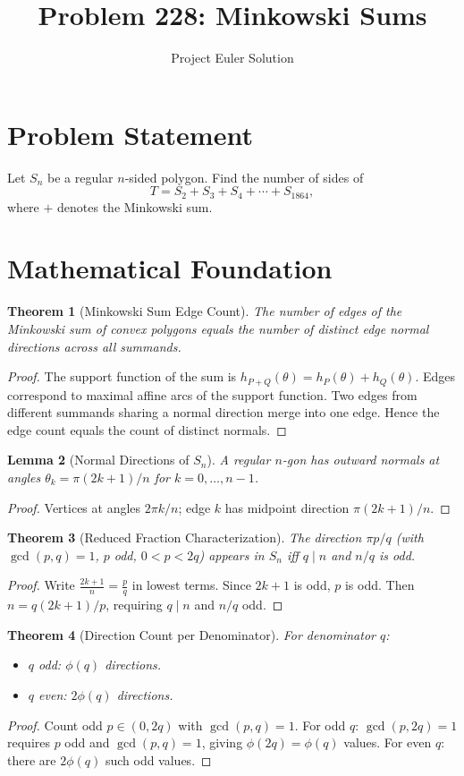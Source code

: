 \documentclass[12pt]{article}
\title{Problem 228: Minkowski Sums}
\author{Project Euler Solution}
\date{}
\newtheorem{theorem}{Theorem}
\newtheorem{lemma}[theorem]{Lemma}
\begin{document}
\maketitle

\section{Problem Statement}
Let $S_n$ be a regular $n$-sided polygon. Find the number of sides of
\[
T = S_2 + S_3 + S_4 + \cdots + S_{1864},
\]
where $+$ denotes the Minkowski sum.

\section{Mathematical Foundation}

\begin{theorem}[Minkowski Sum Edge Count]
The number of edges of the Minkowski sum of convex polygons equals the number of distinct edge normal directions across all summands.
\end{theorem}
\begin{proof}
The support function of the sum is $h_{P+Q}(\theta) = h_P(\theta) + h_Q(\theta)$. Edges correspond to maximal affine arcs of the support function. Two edges from different summands sharing a normal direction merge into one edge. Hence the edge count equals the count of distinct normals.
\end{proof}

\begin{lemma}[Normal Directions of $S_n$]
A regular $n$-gon has outward normals at angles $\theta_k = \pi(2k+1)/n$ for $k = 0, \ldots, n-1$.
\end{lemma}
\begin{proof}
Vertices at angles $2\pi k/n$; edge $k$ has midpoint direction $\pi(2k+1)/n$.
\end{proof}

\begin{theorem}[Reduced Fraction Characterization]
The direction $\pi p/q$ (with $\gcd(p,q) = 1$, $p$ odd, $0 < p < 2q$) appears in $S_n$ iff $q \mid n$ and $n/q$ is odd.
\end{theorem}
\begin{proof}
Write $\frac{2k+1}{n} = \frac{p}{q}$ in lowest terms. Since $2k+1$ is odd, $p$ is odd. Then $n = q(2k+1)/p$, requiring $q \mid n$ and $n/q$ odd.
\end{proof}

\begin{theorem}[Direction Count per Denominator]
For denominator $q$:
\begin{itemize}
\item $q$ odd: $\phi(q)$ directions.
\item $q$ even: $2\phi(q)$ directions.
\end{itemize}
\end{theorem}
\begin{proof}
Count odd $p \in (0, 2q)$ with $\gcd(p, q) = 1$. For odd $q$: $\gcd(p, 2q) = 1$ requires $p$ odd and $\gcd(p,q)=1$, giving $\phi(2q) = \phi(q)$ values. For even $q$: there are $2\phi(q)$ such odd values.
\end{proof}
\end{document}
